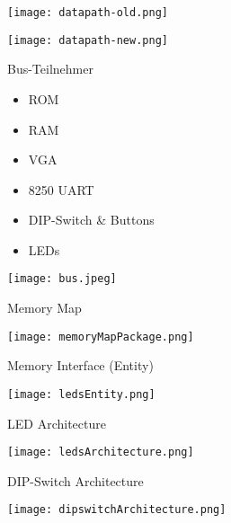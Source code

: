 \begin{frame}[plain]
\texttt{[image: datapath-old.png]}
\end{frame}

\begin{frame}[plain]
\texttt{[image: datapath-new.png]}
\end{frame}

\begin{frame}{Bus-Teilnehmer}
\begin{itemize}
	\item ROM
	\item RAM
	\item VGA
	\item 8250 UART
	\pause
	\item DIP-Switch \& Buttons
	\item LEDs
\end{itemize}

\begin{center}
\texttt{[image: bus.jpeg]} %
\end{center}

\end{frame}

\begin{frame}{Memory Map}
\begin{center}
\texttt{[image: memoryMapPackage.png]}
\end{center} 
\end{frame}

\begin{frame}{Memory Interface (Entity)}
\begin{center}
\texttt{[image: ledsEntity.png]}
\end{center} 
\end{frame}

\begin{frame}{LED Architecture}
\begin{center}
\texttt{[image: ledsArchitecture.png]}
\end{center} 
\end{frame}

\begin{frame}{DIP-Switch Architecture}
\begin{center}
\texttt{[image: dipswitchArchitecture.png]}
\end{center} 
\end{frame}

